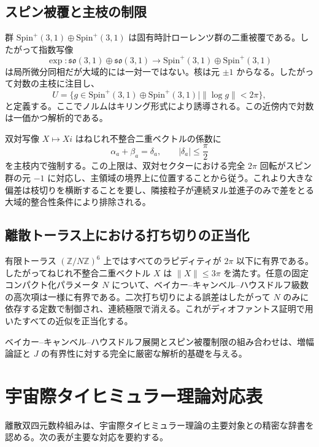 \documentclass[a4paper]{article}
\theoremstyle{definition}
\begin{document}
\subsection{スピン被覆と主枝の制限}

群 $\mathrm{Spin}^+(3,1) \oplus \mathrm{Spin}^+(3,1)$ は固有時計ローレンツ群の二重被覆である。したがって指数写像
\[
\exp : \mathfrak{so}(3,1) \oplus \mathfrak{so}(3,1) \to \mathrm{Spin}^+(3,1) \oplus \mathrm{Spin}^+(3,1)
\]
は局所微分同相だが大域的には一対一ではない。核は元 $\pm 1$ からなる。したがって対数の主枝に注目し、
\[
U = \{ g \in \mathrm{Spin}^+(3,1) \oplus \mathrm{Spin}^+(3,1) \mid \| \log g \| < 2\pi \},
\]
と定義する。ここでノルムはキリング形式により誘導される。この近傍内で対数は一価かつ解析的である。

双対写像 $X \mapsto Xi$ はねじれ不整合二重ベクトルの係数に
\[
\alpha_a + \beta_a = \delta_a, \qquad |\delta_a| \leq \frac{\pi}{2}
\]
を主枝内で強制する。この上限は、双対セクターにおける完全 $2\pi$ 回転がスピン群の元 $-1$ に対応し、主領域の境界上に位置することから従う。これより大きな偏差は枝切りを横断することを要し、隣接粒子が連続ヌル並進子のみで差をとる大域的整合性条件により排除される。

\subsection{離散トーラス上における打ち切りの正当化}

有限トーラス $(\mathbb{Z}/N\mathbb{Z})^6$ 上ではすべてのラピディティが $2\pi$ 以下に有界である。したがってねじれ不整合二重ベクトル $X$ は $\|X\| \leq 3\pi$ を満たす。任意の固定コンパクト化パラメータ $N$ について、ベイカー--キャンベル--ハウスドルフ級数の高次項は一様に有界である。二次打ち切りによる誤差はしたがって $N$ のみに依存する定数で制御され、連続極限で消える。これがディオファントス証明で用いたすべての近似を正当化する。

ベイカー--キャンベル--ハウスドルフ展開とスピン被覆制限の組み合わせは、増幅論証と $J$ の有界性に対する完全に厳密な解析的基礎を与える。

\section{宇宙際タイヒミュラー理論対応表}

離散双四元数枠組みは、宇宙際タイヒミュラー理論の主要対象との精密な辞書を認める。次の表が主要な対応を要約する。
\end{document}
